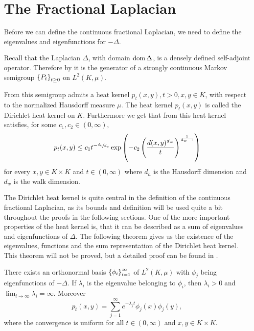 \section{The Fractional Laplacian}\label{sec:FractionalLaplacian}
Before we can define the continuous fractional Laplacian, we need to define the eigenvalues and eigenfunctions for $-\Delta$. 

Recall that the Laplacian $\Delta$, with domain $\operatorname{dom}\Delta$, is a densely defined self-adjoint operator. Therefore by  it is the generator of a strongly continuous Markov semigroup $\cbr{P_t}_{t \geq 0}$ on $L^2(K, \mu)$. 

From \cite[Theorem 8.4]{barlow} this semigroup admits a heat kernel $p_t(x,y), t > 0, x,y \in K$, with respect to the normalized Hausdorff measure $\mu$. The heat kernel $p_t(x,y)$ is called the Dirichlet heat kernel on $K$. Furthermore we get that from \cite[section 2.3]{Fabrice} this heat kernel satisfies, for some $c_1, c_2 \in (0, \infty)$, 
\begin{equation}\label{heatKernelBound}
	p_t(x,y) \leq c_1 t^{-\sfrac{d_h}{d_w}} \exp\left(-c_2 \left(\frac{d(x,y)^{d_w}}{t}\right)^{\frac{1}{d_w -1}}\right)
\end{equation}
for every $x,y \in K \times K$ and $t \in (0, \infty)$ where $d_h$ is the Hausdorff dimension and $d_w$ is the walk dimension. 

\medskip
The Dirichlet heat kernel is quite central in the definition of the continuous fractional Laplacian, as its bounds and definition will be used quite a bit throughout the proofs in the following sections. One of the more important properties of the heat kernel is, that it can be described as a sum of eigenvalues and eigenfunctions of $\Delta$. The following theorem gives us the existence of the eigenvalues, functions and the sum representation of the Dirichlet heat kernel. This theorem will not be proved, but a detailed proof can be found in \cite[Theorem 2.2]{Jozef}.

\medskip
\begin{theorem}\label{heatKernelWritten}
	There exists an orthonormal basis $\cbr{\phi_{i}}^{\infty}_{i = 1}$ of $L^2(K, \mu)$ with $\phi_j$ being eigenfunctions of $-\Delta$. If $\lambda_i$ is the eigenvalue belonging to $\phi_i$, then $\lambda_i >0$ and $\lim_{i \to \infty} \lambda_i = \infty$. Moreover
	\begin{equation}
		p_t(x,y) = \sum_{j = 1}^{\infty} e^{-\lambda_j t} \phi_j(x)\phi_j(y),
	\end{equation}
	where the convergence is uniform for all $t \in (0, \infty)$ and $x,y \in K \times K$.
\end{theorem}


